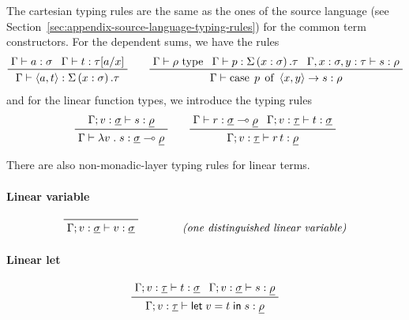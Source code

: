\documentclass[11pt,a4paper]{article}
\theoremstyle{definition}
\theoremstyle{remark}
\providecommand{\casubst}[3]{#1[#3/#2]}
\providecommand{\letst}[3]{\mathsf{let}\;#1=#2\;\mathsf{in}\;#3}
\providecommand{\lintype}[1]{\underline{#1}}
\providecommand{\linto}{\multimap}
\begin{document}
The cartesian typing rules are the same as the ones of the source language (see Section~\ref{sec:appendix-source-language-typing-rules}) for the common term constructors. For the dependent sums, we have the rules
\begin{equation*}
  \prftree{
    \Gamma \vdash a : \sigma
  }{
    \Gamma \vdash t : \casubst{\tau}{x}{a}
  }{
    \Gamma \vdash \tuple{ a, t }: \Sigma \left( x : \sigma \right) . \tau
  }
  \qquad
  \prftree{
    \Gamma \vdash \rho \text{ type}
  }{
    \Gamma \vdash p : \Sigma \left( x : \sigma \right) . \tau
  }{
    \Gamma, x : \sigma, y : \tau \vdash s : \rho
  }{
    \Gamma \vdash \opn[b]{case} \; p \; \opn[b]{of} \; \tuple{ x, y } \to s : \rho
  }
\end{equation*}
and for the linear function types, we introduce the typing rules
\begin{equation*}
  \prftree{
    \Gamma; v : \lintype{\sigma} \vdash s : \lintype{\rho}
  }{
    \Gamma \vdash \lambda v \; . \; s : \lintype{\sigma} \linto \lintype{\rho}
  }
  \qquad
  \prftree{
    \Gamma \vdash r : \lintype{\sigma} \linto \lintype{\rho}
  }{
    \Gamma; v : \lintype{\tau} \vdash t : \lintype{\sigma}
  }{
    \Gamma; v : \lintype{\tau} \vdash
    \linapp{r}{t} : \lintype{\rho}
  }
\end{equation*}

There are also non-monadic-layer typing rules for linear terms. 

\paragraph{Linear variable}

\begin{equation*}
  \prftree{}{
    \Gamma; v : \lintype{\sigma} \vdash v : \lintype{\sigma}
  }
  \qquad\qquad
  \textit{(one distinguished linear variable)}
\end{equation*}

\paragraph{Linear let}

\begin{equation*}
  \prftree{
    \Gamma; v : \lintype{\tau} \vdash t : \lintype{\sigma}
  }{
    \Gamma; v : \lintype{\sigma} \vdash s : \lintype{\rho}
  }{
    \Gamma; v : \lintype{\tau} \vdash \letst{v}{t}{s} : \lintype{\rho}
  }
\end{equation*}
\end{document}
